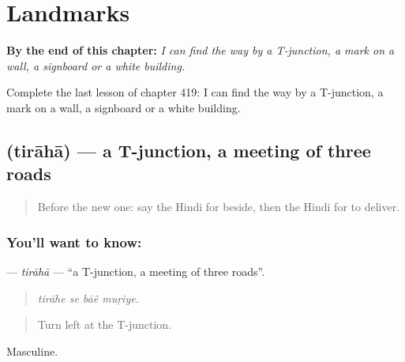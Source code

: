 
\chapter{Landmarks}
\label{ch:hi-landmarks}

\begin{chapteropening}
\textbf{By the end of this chapter:} \emph{I can find the way by a T-junction, a mark on a wall, a signboard or a white building.}

Complete the last lesson of chapter 419: I can find the way by a T-junction, a mark on a wall, a signboard or a white building.
\end{chapteropening}

\section[\texorpdfstring{\hi{तिराहा} (tirāhā)}{तिराहा (tirāhā)}]{ (tirāhā) — a T-junction, a meeting of three roads}

\label{lesson:HI-C419-tiraha}



\begin{quote}
Before the new one: say the Hindi for beside, then the Hindi for to deliver.
\end{quote}

\subsection*{You'll want to know: }
\textbf{} — \emph{tirāhā} — \textquotedblleft{}a T-junction, a meeting of three roads\textquotedblright{}.

\begin{quote}
   
\end{quote}

\begin{quote}
\emph{tirāhe se bāẽ muṛiye.}
\end{quote}

\begin{quote}
Turn left at the T-junction.
\end{quote}

Masculine.

